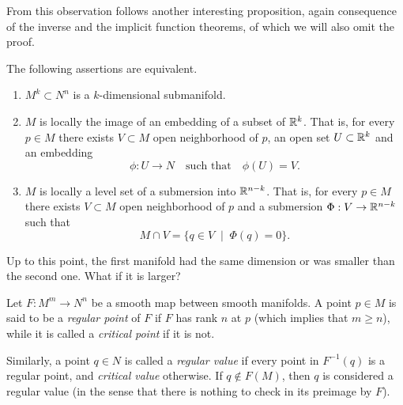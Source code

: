 From this observation follows another interesting proposition, again consequence of the inverse and the implicit function theorems, of which we will also omit the proof.

\begin{prop}
    The following assertions are equivalent.
    \begin{enumerate}
        \item $M^k\subset N^n$ is a $k$-dimensional submanifold.
        \item $M$ is locally the image of an embedding of a subset of $\mathbb{R}^k$. That is, for every $p\in M$ there exists $V\subset M$ open neighborhood of $p$, an open set $U\subset\mathbb{R}^k$ and an embedding
        \begin{equation}
            \phi : U \to N \quad\mbox{such that}\quad \phi(U)=V.
        \end{equation}
        \item $M$ is locally a level set of a submersion into $\mathbb{R}^{n-k}$. That is, for every $p\in M$ there exists $V\subset M$ open neighborhood of $p$ and a submersion $\Phi: V \to\mathbb{R}^{n-k}$ such that
        \begin{equation}
            M\cap V = \{q\in V \;\mid\; \Phi(q) = 0\}.
        \end{equation}
    \end{enumerate}
\end{prop}

Up to this point, the first manifold had the same dimension or was smaller than the second one.
What if it is larger?

\begin{defn}
    Let $F:M^m \to N^n$ be a smooth map between smooth manifolds.
    A point $p\in M$ is said to be a \emph{regular point} of $F$ if $F$ has rank $n$ at $p$ (which implies that $m\geq n$), while it is called a \emph{critical point} if it is not.

    Similarly, a point $q\in N$ is called a \emph{regular value} if every point in $F^{-1}(q)$ is a regular point, and \emph{critical value} otherwise. If $q\not\in F(M)$, then $q$ is considered a regular value (in the sense that there is nothing to check in its preimage by $F$).
\end{defn}

\TODO